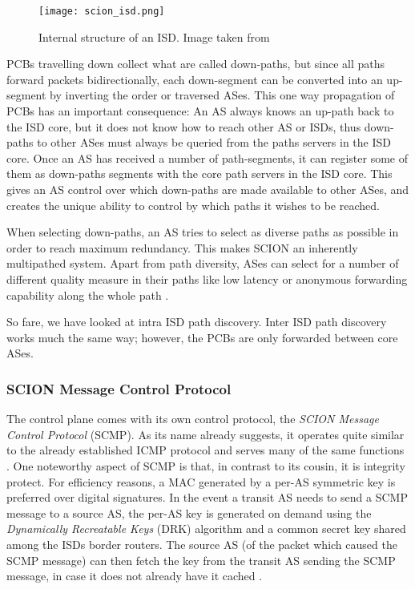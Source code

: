 \documentclass[../eva1_scion.tex]{subfiles}
\begin{document}
    \begin{figure}[ht]
        \centering
        \texttt{[image: scion\_isd.png]}
        \caption{Internal structure of an ISD. Image taken from \cite{scion_2017}}%
        \label{fig:isd}
    \end{figure}

    PCBs travelling down collect what are called down-paths, but since all paths forward packets bidirectionally, each down-segment can be converted into an up-segment by inverting the order or traversed ASes. This one way propagation of PCBs has an important consequence: An AS always knows an up-path back to the ISD core, but it does not know how to reach other AS or ISDs, thus down-paths to other ASes must always be queried from the paths servers in the ISD core. Once an AS has received a number of path-segments, it can register some of them as down-paths segments with the core path servers in the ISD core. This gives an AS control over which down-paths are made available to other ASes, and creates the unique ability to control by which paths it wishes to be reached.

    When selecting down-paths, an AS tries to select as diverse paths as possible in order to reach maximum redundancy. This makes SCION an inherently multipathed system. Apart from path diversity, ASes can select for a number of different quality measure in their paths like low latency or anonymous forwarding capability along the whole path \cite{scion_2011}.

    So fare, we have looked at intra ISD path discovery. Inter ISD path discovery works much the same way; however, the PCBs are only forwarded between core ASes.

    \subsubsection{SCION Message Control Protocol} \label{sssec:scmp}
    The control plane comes with its own control protocol, the \textit{SCION Message Control Protocol} (SCMP). As its name already suggests, it operates quite similar to the already established ICMP protocol and serves many of the same functions \cite{scion_2015}. One noteworthy aspect of SCMP is that, in contrast to its cousin, it is integrity protect. For efficiency reasons, a MAC generated by a per-AS symmetric key is preferred over digital signatures. In the event a transit AS needs to send a SCMP message to a source AS, the per-AS key is generated on demand using the \textit{Dynamically Recreatable Keys} (DRK) algorithm and a common secret key shared among the ISDs border routers. The source AS (of the packet which caused the SCMP message) can then fetch the key from the transit AS sending the SCMP message, in case it does not already have it cached \cite{scion_2015}. 
\end{document}

